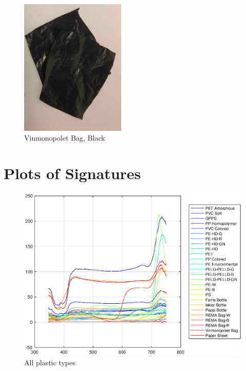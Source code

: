 \begin{appendices}
\begin{figure}
    \centering
    \includegraphics[width = 5cm]{Images/appendix/vmp.png}
    \caption[$\; \:$Vinmonopolet Bag]{Vinmonopolet Bag, Black}
    \label{fig:vinmono}
\end{figure}

















\chapter{Plots of Signatures}
\label{app:signatures}

\begin{figure}
    \centering
    \includegraphics[width = 12cm]{Images/appendix/All.eps}
    \caption[All Plastic Types]{All plastic types}
    \label{fig:all}
\end{figure}


\end{appendices}
